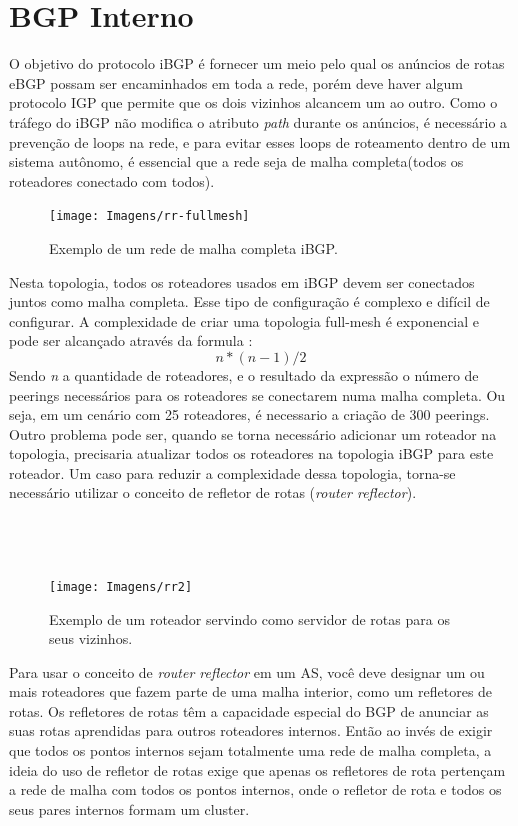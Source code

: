 \documentclass[12pt,a4paper]{report}
\begin{document}
\section{BGP Interno}
O objetivo do protocolo iBGP \'e fornecer um meio pelo qual os an\'uncios de rotas eBGP possam ser encaminhados em toda a rede, por\'em deve haver algum protocolo IGP que permite que os dois vizinhos alcancem um ao outro. Como o tr\'afego do iBGP n\~ao modifica o atributo \textit{path} durante os an\'uncios, \'e necess\'ario a preven\c{c}\~ao de loops na rede, e para evitar esses loops de roteamento dentro de um sistema aut\^onomo, \'e essencial que a rede seja de malha completa(todos os roteadores conectado com todos).

\begin{figure}[!htb]
 \centering
 \texttt{[image: Imagens/rr-fullmesh]}
  \caption{\label{fig:rr-fullmesh} Exemplo de um rede de malha completa iBGP.\cite{EscalandoBGP}}
\end{figure}

Nesta topologia, todos os roteadores usados em iBGP devem ser conectados juntos como malha completa. Esse tipo de configura\c{c}\~ao \'e complexo e dif\'icil de configurar. A complexidade de criar uma topologia full-mesh \'e exponencial e pode ser alcan\c{c}ado atrav\'es da formula\cite{rfc4271} : \[ n*(n-1)/2 \]
Sendo \textit{n} a quantidade de roteadores, e o resultado da express\~ao o n\'umero de peerings necess\'arios para os roteadores se conectarem numa malha completa. Ou seja, em um cen\'ario com 25 roteadores, \'e necessario a cria\c{c}\~ao de 300 peerings. Outro problema pode ser, quando se torna necess\'ario adicionar um roteador na topologia, precisaria atualizar todos os roteadores na topologia iBGP para este roteador. Um caso para reduzir a complexidade dessa topologia, torna-se necess\'ario utilizar o conceito de refletor de rotas (\textit{router reflector}).
\\
\\
\\
\\
\begin{figure}[!htb]
 \centering
 \texttt{[image: Imagens/rr2]}
  \caption{\label{fig:rr2} Exemplo de um roteador servindo como servidor de rotas para os seus vizinhos.\cite{EscalandoBGP}}
\end{figure}

Para usar o conceito de \textit{router reflector} em um AS, voc\^e deve designar um ou mais roteadores que fazem parte de uma malha interior, como um refletores de rotas. Os refletores de rotas t\^em a capacidade especial do BGP de anunciar as suas rotas aprendidas para outros roteadores internos\cite{rfc4456}. Ent\~ao ao inv\'es de exigir que todos os pontos internos sejam totalmente uma rede de malha completa, a ideia do uso de refletor de rotas exige que apenas os refletores de rota perten\c{c}am a rede de malha com todos os pontos internos, onde o refletor de rota e todos os seus pares internos formam um cluster.
\end{document}
